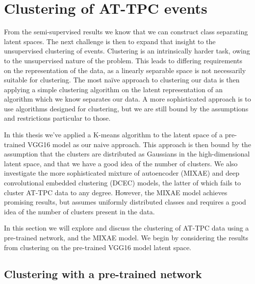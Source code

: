 \section{Clustering of AT-TPC events}

From the semi-supervised results we know that we can construct class separating latent spaces. The next challenge is then to expand that insight to the unsupervised clustering of events. Clustering is an intrinsically harder task, owing to the unsupervised nature of the problem. This leads to differing requirements on the representation of the data, as a linearly separable space is not necessarily suitable for clustering. The most naïve approach to clustering our data is then applying a simple clustering algorithm on the latent representation of an algorithm which we know separates our data. A more sophisticated approach is to use algorithms designed for clustering, but we are still bound by the assumptions and restrictions particular to those. 

In this thesis we've applied a K-means algorithm to the latent space of a pre-trained VGG16 model as our naive approach. This approach is then bound by the assumption that the clusters are distributed as Gaussians in the high-dimensional latent space, and that we have a good idea of the number of clusters. We also investigate the more sophisticated mixture of autoencoder (MIXAE) and deep convolutional embedded clustering (DCEC) models, the latter of which fails to cluster AT-TPC data to any degree. However, the MIXAE model achieves promising results, but assumes uniformly distributed classes and requires a good idea of the number of clusters present in the data.

In this section we will explore and discuss the clustering of AT-TPC data using a pre-trained network, and the MIXAE model. We begin by considering the results from clustering on the pre-trained VGG16 model latent space. 

\subsection{Clustering with a pre-trained network}

